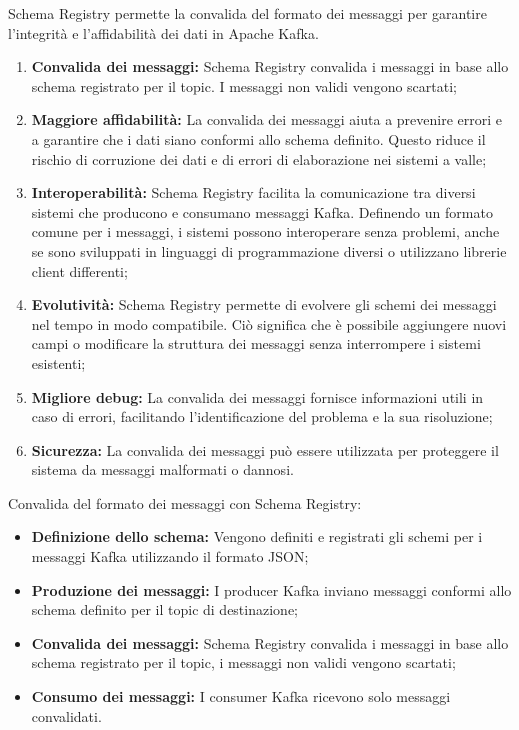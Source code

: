 Schema Registry permette la convalida del formato dei messaggi per garantire l'integrità e l'affidabilità dei dati in Apache Kafka.
\begin{enumerate}
    \item \textbf{Convalida dei messaggi:} Schema Registry convalida i messaggi in base allo schema registrato per il topic. I messaggi non validi vengono scartati;
    \item \textbf{Maggiore affidabilità:} La convalida dei messaggi aiuta a prevenire errori e a garantire che i dati siano conformi allo schema definito. Questo riduce il rischio di corruzione dei dati e di errori di elaborazione nei sistemi a valle;
    \item \textbf{Interoperabilità:} Schema Registry facilita la comunicazione tra diversi sistemi che producono e consumano messaggi Kafka. Definendo un formato comune per i messaggi, i sistemi possono interoperare senza problemi, anche se sono sviluppati in linguaggi di programmazione diversi o utilizzano librerie client differenti;
    \item \textbf{Evolutività:} Schema Registry permette di evolvere gli schemi dei messaggi nel tempo in modo compatibile. Ciò significa che è possibile aggiungere nuovi campi o modificare la struttura dei messaggi senza interrompere i sistemi esistenti;
    \item \textbf{Migliore debug:} La convalida dei messaggi fornisce informazioni utili in caso di errori, facilitando l'identificazione del problema e la sua risoluzione;
    \item \textbf{Sicurezza:} La convalida dei messaggi può essere utilizzata per proteggere il sistema da messaggi malformati o dannosi.
\end{enumerate}

Convalida del formato dei messaggi con Schema Registry:
\begin{itemize}
    \item \textbf{Definizione dello schema:} Vengono definiti e registrati gli schemi per i messaggi Kafka utilizzando il formato JSON;
    \item \textbf{Produzione dei messaggi:} I producer Kafka inviano messaggi conformi allo schema definito per il topic di destinazione;
    \item \textbf{Convalida dei messaggi:} Schema Registry convalida i messaggi in base allo schema registrato per il topic, i messaggi non validi vengono scartati;
    \item \textbf{Consumo dei messaggi:} I consumer Kafka ricevono solo messaggi convalidati.
\end{itemize}

